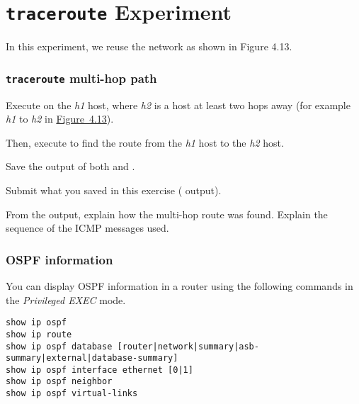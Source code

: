 \documentclass{../UTNetLab}
\begin{document}
\part{\texttt{traceroute} Experiment}
In this experiment, we reuse the network as shown in Figure 4.13.

\section{\texttt{traceroute} multi-hop path}\label{sec:traceroute}
Execute  on the \textit{h1} host, where \textit{h2} is a host at least two hops away (for example \textit{h1} to \textit{h2} in \hyperref[fig:4.13]{Figure~4.13}).

Then, execute  to find the route from the \textit{h1} host to the \textit{h2} host.

Save the output of both  and .

\begin{report}
    \item Submit what you saved in this exercise ( output).

    \item From the  output, explain how the multi-hop route was found.
    Explain the sequence of the ICMP messages used.
\end{report}

\newpage
\appendix

\section{OSPF information}
You can display OSPF information in a router using the following commands in the \textit{Privileged EXEC} mode.
\begin{lstlisting}[language={cisco}]
show ip ospf
show ip route
show ip ospf database [router|network|summary|asb-summary|external|database-summary]
show ip ospf interface ethernet [0|1]
show ip ospf neighbor
show ip ospf virtual-links
    \end{lstlisting}
\end{document}
